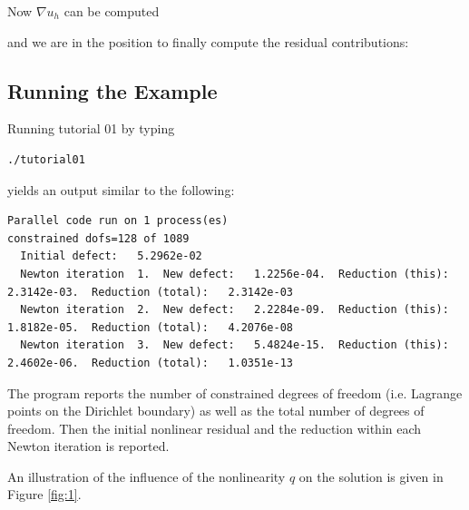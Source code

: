 \documentclass[a4paper,12pt]{article}
\begin{document}
Now $\nabla u_h$ can be computed

and we are in the position to finally compute the residual contributions:


\subsection{Running the Example}

Running tutorial 01 by typing
\begin{lstlisting}[basicstyle=\ttfamily\small,
frame=single,
backgroundcolor=\color{listingbg}]
./tutorial01
\end{lstlisting}
yields an output similar to the following:
\begin{lstlisting}[basicstyle=\ttfamily\tiny,
frame=single,
backgroundcolor=\color{listingbg}]
Parallel code run on 1 process(es)
constrained dofs=128 of 1089
  Initial defect:   5.2962e-02
  Newton iteration  1.  New defect:   1.2256e-04.  Reduction (this):   2.3142e-03.  Reduction (total):   2.3142e-03
  Newton iteration  2.  New defect:   2.2284e-09.  Reduction (this):   1.8182e-05.  Reduction (total):   4.2076e-08
  Newton iteration  3.  New defect:   5.4824e-15.  Reduction (this):   2.4602e-06.  Reduction (total):   1.0351e-13
\end{lstlisting}
The program reports the number of constrained degrees of freedom
(i.e. Lagrange points on the Dirichlet boundary) as well as the total number of degrees of freedom.
Then the initial nonlinear residual and the reduction within each Newton iteration is reported.

An illustration of the influence of the nonlinearity $q$ on the solution is given in 
Figure \ref{fig:1}.
\end{document}
